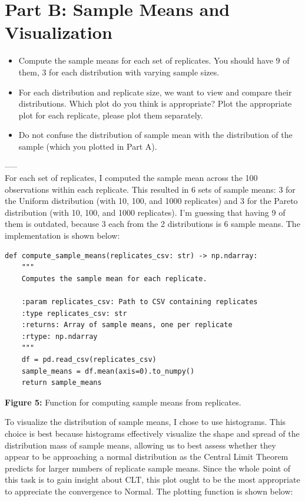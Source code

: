 \section{Part B: Sample Means and Visualization}
\begin{itemize}

    \item Compute the sample means for each set of replicates. You should have 9 of them, 3 for each distribution with varying sample sizes.
    \item For each distribution and replicate size, we want to view and compare their distributions. Which plot do you think is appropriate? Plot the appropriate plot for each replicate, please plot them separately. 
    \item Do not confuse the distribution of sample mean with the distribution of the sample (which you plotted in Part A).
\end{itemize}
-----\\

For each set of replicates, I computed the sample mean across the 100 observations within each replicate. This resulted in 6 sets of sample means: 3 for the Uniform distribution (with 10, 100, and 1000 replicates) and 3 for the Pareto distribution (with 10, 100, and 1000 replicates). I'm guessing that having 9 of them is outdated, because 3 each from the 2 distributions is 6 sample means. The implementation is shown below:\\

\begin{verbatim}
def compute_sample_means(replicates_csv: str) -> np.ndarray:
    """
    Computes the sample mean for each replicate.
    
    :param replicates_csv: Path to CSV containing replicates
    :type replicates_csv: str
    :returns: Array of sample means, one per replicate
    :rtype: np.ndarray
    """
    df = pd.read_csv(replicates_csv)
    sample_means = df.mean(axis=0).to_numpy()
    return sample_means
\end{verbatim}

\begin{center}
\textbf{Figure 5:} Function for computing sample means from replicates.\\
\end{center}

To visualize the distribution of sample means, I chose to use histograms. This choice is best because histograms effectively visualize the shape and spread of the distribution mass of sample means, allowing us to best assess whether they appear to be approaching a normal distribution as the Central Limit Theorem predicts for larger numbers of replicate sample means. Since the whole point of this task is to gain insight about CLT, this plot ought to be the most appropriate to appreciate the convergence to Normal. The plotting function is shown below:


